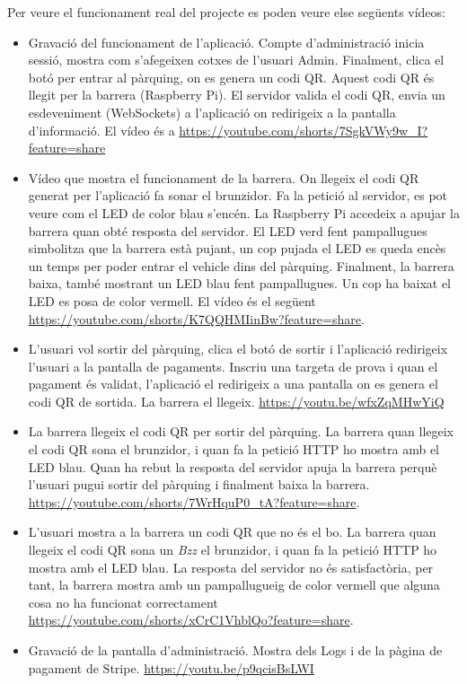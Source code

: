 Per veure el funcionament real del projecte es poden veure else següents vídeos:
\begin{itemize}
    \item Gravació del funcionament de l'aplicació. Compte d'administració inicia sessió,
    mostra com s'afegeixen cotxes de l'usuari Admin. Finalment, clica el botó per entrar al
    pàrquing, on es genera un codi QR. Aquest codi QR és llegit per la barrera (Raspberry Pi).
    El servidor valida el codi QR, envia un esdeveniment (WebSockets) a l'aplicació on
    redirigeix a la pantalla d'informació.
    El vídeo és a \url{https://youtube.com/shorts/7SgkVWy9w_I?feature=share}
    \item Vídeo que mostra el funcionament de la barrera. On llegeix el codi QR generat per l'aplicació
    fa sonar el brunzidor. Fa la petició al servidor, es pot veure com el LED de color blau s'encén.
    La Raspberry Pi accedeix a apujar la barrera quan obté resposta del servidor. El LED verd fent pampallugues
    simbolitza que la barrera està pujant, un cop pujada el LED es queda encès un temps per poder entrar el
    vehicle dins del pàrquing. Finalment, la barrera baixa, també mostrant un LED blau fent pampallugues.
    Un cop ha baixat el LED es posa de color vermell.
    El vídeo és el següent \url{https://youtube.com/shorts/K7QQHMIinBw?feature=share}.
    \item L'usuari vol sortir del pàrquing, clica el botó de sortir i l'aplicació redirigeix l'usuari
    a la pantalla de pagaments. Inscriu una targeta de prova i quan el pagament és validat, l'aplicació el
    redirigeix a una pantalla on es genera el codi QR de sortida. La barrera el llegeix.
    \url{https://youtu.be/wfxZqMHwYiQ}
    \item La barrera llegeix el codi QR per sortir del pàrquing. La barrera quan llegeix el codi
    QR sona el brunzidor, i quan fa la petició HTTP ho mostra amb el LED blau. Quan ha rebut la resposta del servidor
    apuja la barrera perquè l'usuari pugui sortir del pàrquing i finalment baixa la barrera.
    \url{https://youtube.com/shorts/7WrHquP0_tA?feature=share}.
    \item L'usuari mostra a la barrera un codi QR que no és el bo. La barrera quan llegeix el codi
    QR sona un \emph{Bzz} el brunzidor, i quan fa la petició HTTP ho mostra amb el LED blau.
    La resposta del servidor no és satisfactòria, per tant, la barrera mostra amb un pampallugueig de color vermell que alguna
    cosa no ha funcionat correctament \url{https://youtube.com/shorts/xCrC1VhblQo?feature=share}.
    \item Gravació de la pantalla d'administració. Mostra dels Logs i de la pàgina de pagament de Stripe.
    \url{https://youtu.be/p9qcisBsLWI}
\end{itemize}
